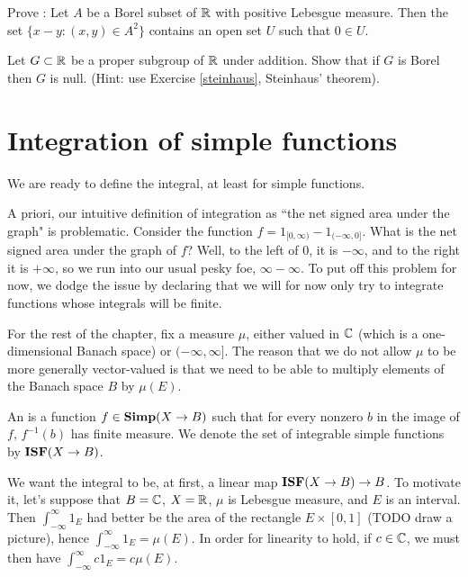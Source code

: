 \begin{exercise}
\label{steinhaus}
Prove : Let $A$ be a Borel subset of $\mathbb{R}$ with positive Lebesgue measure. Then the set $\{x - y: (x, y) \in A^2\}$ contains an open set $U$ such that $0 \in U$.
\end{exercise}

\begin{exercise}
Let $G \subset \mathbb{R}$ be a proper subgroup of $\mathbb{R}$ under addition.
Show that if $G$ is Borel then $G$ is null.
(Hint: use Exercise \ref{steinhaus}, Steinhaus' theorem).
\end{exercise}


\section{Integration of simple functions}
We are ready to define the integral, at least for simple functions.

\begin{subsec}
A priori, our intuitive definition of integration as ``the net signed area under the graph" is problematic.
Consider the function $f = 1_{[0, \infty)} - 1_{(-\infty, 0]}$. What is the net signed area under the graph of $f$? Well, to the left of $0$, it is $-\infty$, and to the right it is $+\infty$, so we run into our usual pesky foe, $\infty - \infty$.
To put off this problem for now, we dodge the issue by declaring that we will for now only try to integrate functions whose integrals will be finite.
\end{subsec}

\begin{subsec}
For the rest of the chapter, fix a measure $\mu$, either valued in $\mathbb{C}$ (which is a one-dimensional Banach space) or $(-\infty, \infty]$.
The reason that we do not allow $\mu$ to be more generally vector-valued is that we need to be able to multiply elements of the Banach space $B$ by $\mu(E)$.
\end{subsec}

\begin{definition}
An  is a function $f \in \mathbf{Simp}(X \to B)$ such that for every nonzero $b$ in the image of $f$, $f^{-1}(b)$ has finite measure.
We denote the set of integrable simple functions by $\mathbf{ISF}(X \to B)$.
\end{definition}

\begin{subsec}
We want the integral to be, at first, a linear map $\mathbf{ISF}(X \to B) \to B$.
To motivate it, let's suppose that $B = \mathbb{C}$, $X = \mathbb{R}$, $\mu$ is Lebesgue measure, and $E$ is an interval. Then $\int_{-\infty}^{\infty} 1_E$ had better be the area of the rectangle $E \times [0, 1]$ (TODO draw a picture), hence $\int_{-\infty}^{\infty} 1_{E} = \mu(E)$. In order for linearity to hold, if $c \in \mathbb{C}$, we must then have $\int_{-\infty}^{\infty} c1_{E} = c\mu(E)$.
\end{subsec}

